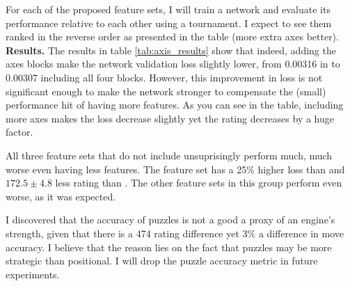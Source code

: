 For each of the proposed feature sets, I will train a network and evaluate its performance relative to each other using a tournament. I expect to see them ranked in the reverse order as presented in the table (more extra axes better). \\

\textbf{Results.} The results in table \ref{tab:axis_results} show that indeed, adding the axes blocks make the network validation loss slightly lower, from 0.00316 in  to 0.00307 including all four blocks. However, this improvement in loss is not significant enough to make the network stronger to compensate the (small) performance hit of having more features. As you can see in the table, including more axes makes the loss decrease slightly yet the rating decreases by a huge factor.

All three feature sets that do not include  unsuprisingly perform much, much worse even having less features. The feature set  has a 25\% higher loss than  and $172.5 \pm 4.8$ less rating than . The other feature sets in this group perform even worse, as it was expected.

I discovered that the accuracy of puzzles is not a good a proxy of an engine's strength, given that there is a 474 rating difference yet 3\% a difference in move accuracy. I believe that the reason lies on the fact that puzzles may be more strategic than positional. I will drop the puzzle accuracy metric in future experiments.


